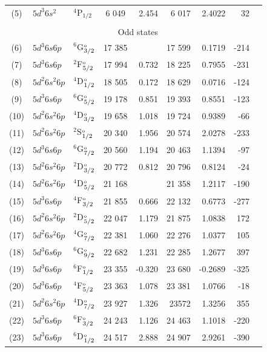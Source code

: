 \documentclass[10pt,a4paper, twoside, openright]{report}
\begin{document}
{\begin{longtable}{cllcrrrrr}
(5)  &$5d^3 6s^2$ & $^4$P$_{1/2}$  & 6 049 & 2.454 & 6 017 & 2.4022 & 32\\
\\
\multicolumn{5}{r}{ Odd states}\\
(6)  &$5d^3 6s 6p$ & $^6$G$^{\rm_o}_{3/2}$    & 17 385 &  & 17 599 &   0.1719   &  -214\\
(7)  &$5d^3 6s 6p$ & $^2$F$^{\rm_o}_{5/2}$    & 17 994 & 0.732 &  18 225 &   0.7955  & -231\\
(8)  &$5d^2 6s^2 6p$ & $^4$D$^{\rm_o}_{1/2}$    & 18 505 & 0.172 & 18 629 &   0.0716  & -124\\
(9)  &$5d^3 6s 6p$ & $^6$G$^{\rm_o}_{5/2}$    & 19 178 & 0.851 & 19 393 &   0.8551 &  -123\\
(10)  &$5d^2 6s^2 6p$ & $^4$D$^{\rm_o}_{3/2}$    & 19 658 & 1.018 & 19 724 &   0.9389 & -66\\
(11)  &$5d^2 6s^2 6p$ & $^2$S$^{\rm_o}_{1/2}$    & 20 340 & 1.956 & 20 574 &   2.0278 & -233\\
(12)  &$5d^3 6s 6p$ & $^6$G$^{\rm_o}_{7/2}$    & 20 560 & 1.194 & 20 463 &   1.1394 & -97\\
(13)  &$5d^2 6s^2 6p$ & $^2$D$^{\rm_o}_{3/2}$    & 20 772 & 0.812 & 20 796 &     0.8124 & -24\\
(14)  &$5d^2 6s^2 6p$ & $^4$D$^{\rm_o}_{5/2}$    & 21 168 &   & 21 358 &   1.2117 &  -190\\
(15)  &$5d^3 6s 6p$ & $^4$F$^{\rm_o}_{3/2}$   & 21 855 & 0.666 & 22 132 & 0.6773 & -277 \\
(16)  &$5d^2 6s^2 6p$ & $^2$D$^{\rm_o}_{5/2}$  & 22 047 & 1.179 & 21 875 & 1.0838 & 172 \\
(17)  &$5d^2 6s^2 6p$ & $^4$G$^{\rm_o}_{7/2}$    & 22 381 & 1.060 & 22 276 & 1.0377 & 105 \\
(18)  &$5d^3 6s 6p$ & $^6$G$^{\rm_o}_{9/2}$   & 22 682 & 1.231 & 22 285 & 1.2677 & 397 \\
(19)  &$5d^3 6s 6p$ & $^6$F$^{\rm_o}_{1/2}$  & 23 355 & -0.320 & 23 680 & -0.2689 & -325 \\
(20)  &$5d^3 6s 6p$ & $^4$F$^{\rm_o}_{5/2}$   & 23 363 & 1.078 & 23 381 & 1.0766 & -18 \\
(21)  &$5d^2 6s^2 6p$ & $^4$D$^{\rm_o}_{7/2}$   & 23 927 & 1.326 & 23572 & 1.3256 & 355 \\
(22)  &$5d^3 6s 6p$ & $^6$F$^{\rm_o}_{3/2}$   & 24 243 & 1.126 & 24 463 & 1.1018 & -220 \\
(23)  &$5d^3 6s 6p$ & $^6$D$^{\rm_o}_{1/2}$   & 24 517 & 2.888 & 24 907 & 2.9261 & -390 \\

\end{longtable}}
\end{document}
